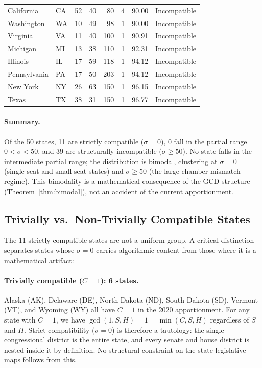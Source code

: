 \begin{longtable}{llrrrrrl}
California    & CA & 52 &  40 &  80 & 4 &  90.00 & Incompatible \\
Washington    & WA & 10 &  49 &  98 & 1 &  90.00 & Incompatible \\
Virginia      & VA & 11 &  40 & 100 & 1 &  90.91 & Incompatible \\
Michigan      & MI & 13 &  38 & 110 & 1 &  92.31 & Incompatible \\
Illinois      & IL & 17 &  59 & 118 & 1 &  94.12 & Incompatible \\
Pennsylvania  & PA & 17 &  50 & 203 & 1 &  94.12 & Incompatible \\
New York      & NY & 26 &  63 & 150 & 1 &  96.15 & Incompatible \\
Texas         & TX & 38 &  31 & 150 & 1 &  96.77 & Incompatible \\
\end{longtable}

\paragraph{Summary.}  Of the 50 states, 11 are strictly compatible ($\sigma = 0$),
0 fall in the partial range $0 < \sigma < 50$, and 39 are structurally
incompatible ($\sigma \geq 50$).  No state falls in the intermediate partial
range; the distribution is bimodal, clustering at $\sigma = 0$ (single-seat
and small-seat states) and $\sigma \geq 50$ (the large-chamber mismatch regime).
This bimodality is a mathematical consequence of the GCD structure
(Theorem~\ref{thm:bimodal}), not an accident of the current apportionment.

\subsection{Trivially vs.\ Non-Trivially Compatible States}
\label{subsec:trivial}

The 11 strictly compatible states are not a uniform group.  A critical
distinction separates states whose $\sigma = 0$ carries algorithmic content
from those where it is a mathematical artifact:

\paragraph{Trivially compatible ($C = 1$): 6 states.}
Alaska (AK), Delaware (DE), North Dakota (ND), South Dakota (SD), Vermont (VT),
and Wyoming (WY) all have $C = 1$ in the 2020 apportionment.
For any state with $C = 1$, we have $\gcd(1, S, H) = 1 = \min(C,S,H)$
regardless of $S$ and $H$.  Strict compatibility ($\sigma = 0$) is therefore
a tautology: the single congressional district is the entire state, and every
senate and house district is nested inside it by definition.  No structural
constraint on the state legislative maps follows from this.

